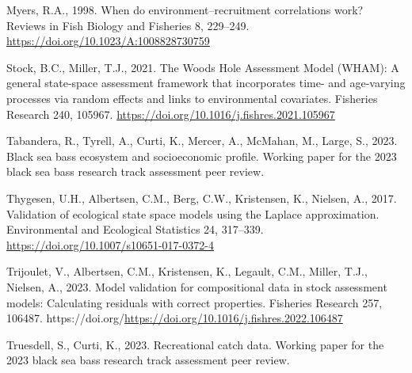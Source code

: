 \documentclass[
]{article}
\newlength{\cslhangindent}
\newlength{\cslentryspacingunit} %
\newenvironment{CSLReferences}[2] %
 {%
  \setlength{\parindent}{0pt}
  \ifodd #1
  \let\oldpar\par
  \def\par{\hangindent=\cslhangindent\oldpar}
  \fi
  \setlength{\parskip}{#2\cslentryspacingunit}
 }%
 {}
\begin{document}
\begin{CSLReferences}{1}{0}
\leavevmode{}%
Myers, R.A., 1998. When do environment--recruitment correlations work? Reviews in Fish Biology and Fisheries 8, 229--249. \url{https://doi.org/10.1023/A:1008828730759}

\leavevmode{}%
Stock, B.C., Miller, T.J., 2021. The {Woods Hole Assessment Model} ({WHAM}): A general state-space assessment framework that incorporates time- and age-varying processes via random effects and links to environmental covariates. Fisheries Research 240, 105967. \url{https://doi.org/10.1016/j.fishres.2021.105967}

\leavevmode{}%
Tabandera, R., Tyrell, A., Curti, K., Mercer, A., McMahan, M., Large, S., 2023. Black sea bass ecosystem and socioeconomic profile. Working paper for the 2023 black sea bass research track assessment peer review.

\leavevmode{}%
Thygesen, U.H., Albertsen, C.M., Berg, C.W., Kristensen, K., Nielsen, A., 2017. {Validation of ecological state space models using the Laplace approximation}. Environmental and Ecological Statistics 24, 317--339. \url{https://doi.org/10.1007/s10651-017-0372-4}

\leavevmode{}%
Trijoulet, V., Albertsen, C.M., Kristensen, K., Legault, C.M., Miller, T.J., Nielsen, A., 2023. Model validation for compositional data in stock assessment models: Calculating residuals with correct properties. Fisheries Research 257, 106487. https://doi.org/\url{https://doi.org/10.1016/j.fishres.2022.106487}

\leavevmode{}%
Truesdell, S., Curti, K., 2023. Recreational catch data. Working paper for the 2023 black sea bass research track assessment peer review.

\end{CSLReferences}

\pagebreak
\end{document}
